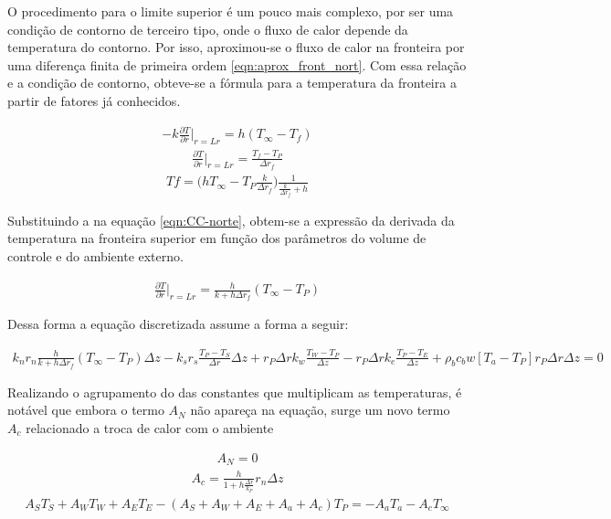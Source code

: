 \documentclass[
	12pt,				%
	openright,			%
	oneside,			%
	a4paper,			%
	english,			%
	french,				%
	spanish,			%
	brazil				%
	]{abntex2}
\begin{document}
O procedimento para o limite superior é um pouco mais complexo, por ser uma condição de contorno de terceiro tipo, onde o fluxo de calor depende da temperatura do contorno. Por isso, aproximou-se o fluxo de calor na fronteira por uma diferença finita de primeira ordem \eqref{eqn:aprox_front_nort}. Com essa relação e a condição de contorno, obteve-se a fórmula para a temperatura da fronteira a partir de fatores já conhecidos. 

\begin{gather}     
\label{eqn:CC-norte}
-k\frac{\partial T}{\partial r}\biggr\rvert_{r=Lr}=h(T_\infty-T_f)
\end{gather}
\begin{gather} 
\label{eqn:aprox_front_nort}
\frac{\partial T}{\partial r}\biggr\rvert_{r=Lr}=
\frac{T_f-T_P}{\Delta r_f}
\end{gather}
\begin{gather}   
Tf=\biggr(h T_\infty-T_P \frac{k}{\Delta r_f}\biggr)\frac{1}{\frac{k}{\Delta r_f} +h}
\end{gather} 

Substituindo a na equação \eqref{eqn:CC-norte}, obtem-se a expressão da derivada da temperatura na fronteira superior em função dos parâmetros do volume de controle e do ambiente externo.

\begin{gather}
\frac{\partial T}{\partial r}\biggr\rvert_{r=Lr}= \frac{h}{k+h \Delta r_f}(T_\infty-T_P)
\end{gather}

Dessa forma a equação discretizada assume a forma a seguir:

\begin{gather}                                         
k_n r_n \frac{h}{k+h \Delta r_f}(T_\infty-T_P)\Delta z -
k_s r_s  \frac{T_P-T_S}{\Delta r}\Delta z +
r_P \Delta r k_w \frac{T_W-T_P}{\Delta z} -
r_P \Delta r k_e \frac{T_P-T_E}{\Delta z}+
\rho_b c_b w [T_a-T_P]r_P \Delta r\Delta z = 0
\end{gather}

Realizando o agrupamento do das constantes que multiplicam as temperaturas, é notável que embora o termo $A_N$ não apareça na equação, surge um novo termo $A_c$ relacionado a troca de calor com o ambiente

\begin{gather}
A_N=0
\end{gather}
\begin{gather}
A_c=\frac{h}{1+h\frac{\Delta r}{k_P}}r_n \Delta z
\end{gather}
\begin{gather}
A_S T_S+A_W T_W+A_E T_E-(A_S+A_W+A_E+A_a+A_c)T_P=-A_a T_a-A_cT_\infty
\end{gather} 
\end{document}
